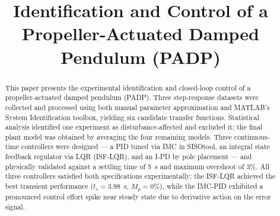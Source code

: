 \documentclass[conference]{IEEEtran}
\begin{document}
\title{Identification and Control of a Propeller-Actuated Damped Pendulum (PADP)}

\author{
  \vspace{2mm}
}

\maketitle

\begin{abstract}
This paper presents the experimental identification and closed-loop control of a propeller-actuated damped pendulum (PADP). Three step-response datasets were collected and processed using both manual parameter approximation and MATLAB's System Identification toolbox, yielding six candidate transfer functions. Statistical analysis identified one experiment as disturbance-affected and excluded it; the final plant model was obtained by averaging the four remaining models. Three continuous-time controllers were designed — a PID tuned via IMC in SISOtool, an integral state feedback regulator via LQR (ISF-LQR), and an I-PD by pole placement — and physically validated against a settling time of 5~s and maximum overshoot of 3\%. All three controllers satisfied both specifications experimentally; the ISF-LQR achieved the best transient performance ($t_s = 3.98$~s, $M_p = 0\%$), while the IMC-PID exhibited a pronounced control effort spike near steady state due to derivative action on the error signal.
\end{abstract}
\end{document}
